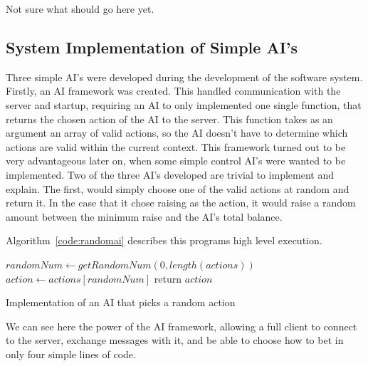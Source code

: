Not sure what should go here yet.

\newpage{}

\subsection{System Implementation of Simple AI's}
Three simple AI's were developed during the development of the software system.
Firstly, an AI framework was created. This handled communication with the
server and startup, requiring an AI to only implemented one single function,
that returns the chosen action of the AI to the server. This function takes
as an argument an array of valid actions, so the AI doesn't have to determine
which actions are valid within the current context. This framework turned out
to be very advantageous later on, when some simple control AI's were wanted
to be implemented. Two of the three AI's developed are trivial to implement
and explain. The first, would simply choose one of the valid actions at
random and return it. In the case that it chose raising as the action, it
would raise a random amount between the minimum raise and the AI's total
balance.

Algorithm~\ref{code:randomai} describes this programs high level execution.

\vspace{0.3cm}

\begin{algorithm}[H]
    \BlankLine{}
     $randomNum \leftarrow getRandomNum(0, length(actions))$\;
     $action \leftarrow actions[randomNum]$\;
     
     return $action$\;
\caption{Implementation of an AI that picks a random action}%
\label{code:randomai}
\end{algorithm}

\vspace{0.3cm}

We can see here the power of the AI framework, allowing a full client to connect
to the server, exchange messages with it, and be able to choose how to bet
in only four simple lines of code.

